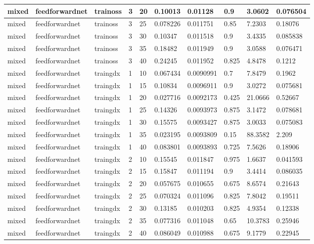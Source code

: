 \begin{longtable}{lllllllll}
mixed & feedforwardnet & trainoss & 3 & 20 & 0.10013 & 0.01128 & 0.9 & 3.0602 & 0.076504 \\ \hline 
mixed & feedforwardnet & trainoss & 3 & 25 & 0.078226 & 0.011751 & 0.85 & 7.2303 & 0.18076 \\ \hline 
mixed & feedforwardnet & trainoss & 3 & 30 & 0.10347 & 0.011518 & 0.9 & 3.4335 & 0.085838 \\ \hline 
mixed & feedforwardnet & trainoss & 3 & 35 & 0.18482 & 0.011949 & 0.9 & 3.0588 & 0.076471 \\ \hline 
mixed & feedforwardnet & trainoss & 3 & 40 & 0.24245 & 0.011952 & 0.825 & 4.8478 & 0.1212 \\ \hline 
mixed & feedforwardnet & traingdx & 1 & 10 & 0.067434 & 0.0090991 & 0.7 & 7.8479 & 0.1962 \\ \hline 
mixed & feedforwardnet & traingdx & 1 & 15 & 0.10834 & 0.0096911 & 0.9 & 3.0272 & 0.075681 \\ \hline 
mixed & feedforwardnet & traingdx & 1 & 20 & 0.027716 & 0.0092173 & 0.425 & 21.0666 & 0.52667 \\ \hline 
mixed & feedforwardnet & traingdx & 1 & 25 & 0.14326 & 0.0093973 & 0.875 & 3.1472 & 0.078681 \\ \hline 
mixed & feedforwardnet & traingdx & 1 & 30 & 0.15575 & 0.0093427 & 0.875 & 3.0033 & 0.075083 \\ \hline 
mixed & feedforwardnet & traingdx & 1 & 35 & 0.023195 & 0.0093809 & 0.15 & 88.3582 & 2.209 \\ \hline 
mixed & feedforwardnet & traingdx & 1 & 40 & 0.083801 & 0.0093893 & 0.725 & 7.5626 & 0.18906 \\ \hline 
mixed & feedforwardnet & traingdx & 2 & 10 & 0.15545 & 0.011847 & 0.975 & 1.6637 & 0.041593 \\ \hline 
mixed & feedforwardnet & traingdx & 2 & 15 & 0.15847 & 0.011194 & 0.9 & 3.4414 & 0.086035 \\ \hline 
mixed & feedforwardnet & traingdx & 2 & 20 & 0.057675 & 0.010655 & 0.675 & 8.6574 & 0.21643 \\ \hline 
mixed & feedforwardnet & traingdx & 2 & 25 & 0.070324 & 0.011096 & 0.825 & 7.8042 & 0.19511 \\ \hline 
mixed & feedforwardnet & traingdx & 2 & 30 & 0.13185 & 0.010203 & 0.825 & 4.9354 & 0.12338 \\ \hline 
mixed & feedforwardnet & traingdx & 2 & 35 & 0.077316 & 0.011048 & 0.65 & 10.3783 & 0.25946 \\ \hline 
mixed & feedforwardnet & traingdx & 2 & 40 & 0.086049 & 0.010988 & 0.675 & 9.1779 & 0.22945 \\ \hline 

\end{longtable}

